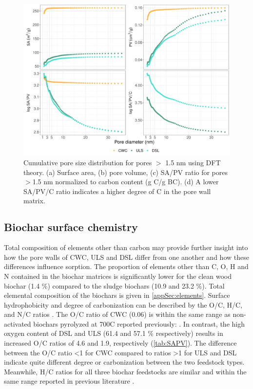 \begin{figure}[htb]
    \centering
    \includegraphics[width=\textwidth]{R/figs/PZD_SAPV_C_large.pdf}
    \caption{Cumulative pore size distribution for pores $>$ 1.5 nm using DFT theory. (a) Surface area, (b) pore volume, (c) SA/PV ratio for pores $>$1.5 nm normalized to carbon content (g C/g BC). (d) A lower SA/PV/C ratio indicates a higher degree of C in the pore wall matrix.}
    \label{fig:PZD_large}
\end{figure}

\subsection{Biochar surface chemistry}
Total composition of elements other than carbon may provide further insight into how the pore walls of CWC, ULS and DSL differ from one another and how these differences influence sorption. The proportion of elements other than C, O, H and N contained in the biochar matrices is significantly lower for the clean wood biochar (1.4 \%) compared to the sludge biochars (10.9 and 23.2 \%). Total elemental composition of the biochars is given in \cref{appSec:elements}. Surface hydrophobicity and degree of carbonization can be described by the O/C, H/C, and N/C ratios \citep{chun2004compositions}. The O/C ratio of CWC (0.06) is within the same range as non-activated biochars pyrolyzed at 700\textdegree C reported previously: \citep{LehmannAndJoseph2015, Kupryianchyk2016a, chun2004compositions}. In contrast, the high oxygen content of DSL and ULS (61.4 and 57.1 \% respectively) results in increased O/C ratios of 4.6 and 1.9, respectively (\cref{tab:SAPV}). The difference between the O/C ratio \textless 1 for CWC compared to ratios \textgreater 1 for ULS and DSL indicate quite different degree or carbonization between the two feedstock types. Meanwhile, H/C ratios for all three biochar feedstocks are similar and within the same range reported in previous literature \citep{Kupryianchyk2016a,chun2004compositions}. 

